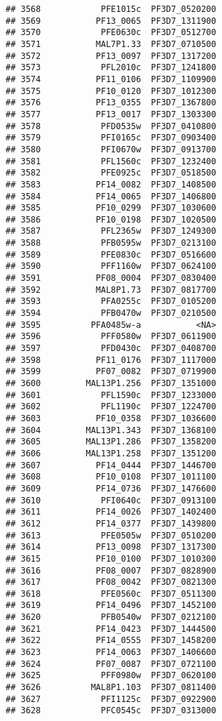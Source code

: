 \documentclass[12pt, a4paper]{article}\usepackage[]{graphicx}\usepackage[]{color}
\makeatletter
\newenvironment{kframe}{%
 \def\at@end@of@kframe{}%
 \ifinner\ifhmode%
  \def\at@end@of@kframe{\end{minipage}}%
  \begin{minipage}{\columnwidth}%
 \fi\fi%
 \def\FrameCommand##1{\hskip\@totalleftmargin \hskip-\fboxsep
 \colorbox{shadecolor}{##1}\hskip-\fboxsep
     \hskip-\linewidth \hskip-\@totalleftmargin \hskip\columnwidth}%
 \MakeFramed {\advance\hsize-\width
   \@totalleftmargin\z@ \linewidth\hsize
   \@setminipage}}%
 {\par\unskip\endMakeFramed%
 \at@end@of@kframe}
\newenvironment{knitrout}{}{} %
\makeatother
\begin{document}
\begin{knitrout}
\begin{kframe}
\begin{verbatim}
## 3568            PFE1015c  PF3D7_0520200
## 3569           PF13_0065  PF3D7_1311900
## 3570            PFE0630c  PF3D7_0512700
## 3571           MAL7P1.33  PF3D7_0710500
## 3572           PF13_0097  PF3D7_1317200
## 3573            PFL2010c  PF3D7_1241800
## 3574           PF11_0106  PF3D7_1109900
## 3575           PF10_0120  PF3D7_1012300
## 3576           PF13_0355  PF3D7_1367800
## 3577           PF13_0017  PF3D7_1303300
## 3578            PFD0535w  PF3D7_0410800
## 3579            PFI0165c  PF3D7_0903400
## 3580            PFI0670w  PF3D7_0913700
## 3581            PFL1560c  PF3D7_1232400
## 3582            PFE0925c  PF3D7_0518500
## 3583           PF14_0082  PF3D7_1408500
## 3584           PF14_0065  PF3D7_1406800
## 3585           PF10_0299  PF3D7_1030600
## 3586           PF10_0198  PF3D7_1020500
## 3587            PFL2365w  PF3D7_1249300
## 3588            PFB0595w  PF3D7_0213100
## 3589            PFE0830c  PF3D7_0516600
## 3590            PFF1160w  PF3D7_0624100
## 3591           PF08_0004  PF3D7_0830400
## 3592           MAL8P1.73  PF3D7_0817700
## 3593            PFA0255c  PF3D7_0105200
## 3594            PFB0470w  PF3D7_0210500
## 3595          PFA0485w-a           <NA>
## 3596            PFF0580w  PF3D7_0611900
## 3597            PFD0430c  PF3D7_0408700
## 3598           PF11_0176  PF3D7_1117000
## 3599           PF07_0082  PF3D7_0719900
## 3600         MAL13P1.256  PF3D7_1351000
## 3601            PFL1590c  PF3D7_1233000
## 3602            PFL1190c  PF3D7_1224700
## 3603           PF10_0358  PF3D7_1036600
## 3604         MAL13P1.343  PF3D7_1368100
## 3605         MAL13P1.286  PF3D7_1358200
## 3606         MAL13P1.258  PF3D7_1351200
## 3607           PF14_0444  PF3D7_1446700
## 3608           PF10_0108  PF3D7_1011100
## 3609           PF14_0736  PF3D7_1476600
## 3610            PFI0640c  PF3D7_0913100
## 3611           PF14_0026  PF3D7_1402400
## 3612           PF14_0377  PF3D7_1439800
## 3613            PFE0505w  PF3D7_0510200
## 3614           PF13_0098  PF3D7_1317300
## 3615           PF10_0100  PF3D7_1010300
## 3616           PF08_0007  PF3D7_0828900
## 3617           PF08_0042  PF3D7_0821300
## 3618            PFE0560c  PF3D7_0511300
## 3619           PF14_0496  PF3D7_1452100
## 3620            PFB0540w  PF3D7_0212100
## 3621           PF14_0423  PF3D7_1444500
## 3622           PF14_0555  PF3D7_1458200
## 3623           PF14_0063  PF3D7_1406600
## 3624           PF07_0087  PF3D7_0721100
## 3625            PFF0980w  PF3D7_0620100
## 3626          MAL8P1.103  PF3D7_0811400
## 3627            PFI1125c  PF3D7_0922900
## 3628            PFC0545c  PF3D7_0313000

\end{verbatim}
\end{kframe}
\end{knitrout}
\end{document}
